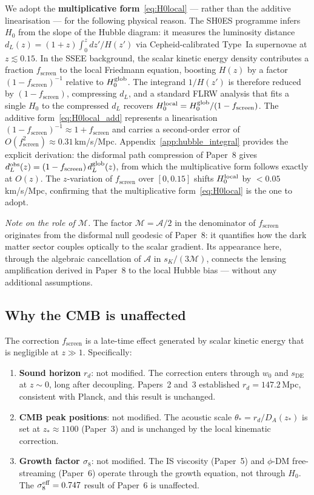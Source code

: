 \documentclass[12pt,a4paper]{article}
\newcommand{\MIRA}{\mathcal{M}}
\newcommand{\AURA}{\mathcal{A}}
\newcommand{\fsc}{f_{\mathrm{screen}}}
\newcommand{\sK}{s_K}          %
\newcommand{\sDE}{s_{\mathrm{DE}}} %
\begin{document}
We adopt the \textbf{multiplicative form}~\eqref{eq:H0local} --- rather than
the additive linearisation --- for the following physical reason.
The SH0ES programme infers $H_0$ from the slope of the Hubble diagram: it
measures the luminosity distance $d_L(z) = (1+z)\!\int_0^z \!dz'/H(z')$ via
Cepheid-calibrated Type~Ia supernovae at $z \lesssim 0.15$.
In the SSEE background, the scalar kinetic energy density contributes a fraction
$\fsc$ to the local Friedmann equation, boosting $H(z)$ by a factor
$(1-\fsc)^{-1}$ relative to $H_0^{\rm glob}$.
The integrand $1/H(z')$ is therefore reduced by $(1-\fsc)$, compressing $d_L$,
and a standard FLRW analysis that fits a single $H_0$ to the compressed $d_L$
recovers $H_0^{\rm local} = H_0^{\rm glob}/(1-\fsc)$.
The additive form~\eqref{eq:H0local_add} represents a linearisation $(1-\fsc)^{-1} \approx 1+\fsc$
and carries a second-order error of $O(\fsc^2) \approx 0.31$\,km/s/Mpc.
Appendix~\ref{app:hubble_integral} provides the explicit derivation: the
disformal path compression of Paper~8 gives $d_L^{\rm obs}(z) = (1-\fsc)\,d_L^{\rm glob}(z)$,
from which the multiplicative form follows exactly at $O(z)$.
The $z$-variation of $\fsc$ over $[0, 0.15]$ shifts $H_0^{\rm local}$ by
$< 0.05$\,km/s/Mpc, confirming that the multiplicative form~\eqref{eq:H0local} is the one to adopt.

\medskip
\noindent\textit{Note on the role of $\MIRA$.}
The factor $\MIRA = \AURA/2$ in the denominator of $\fsc$ originates from
the disformal null geodesic of Paper~8: it quantifies how the dark matter
sector couples optically to the scalar gradient.
Its appearance here, through the algebraic cancellation of $\AURA$ in
$\sK/(3\MIRA)$, connects the lensing amplification derived in Paper~8
to the local Hubble bias --- without any additional assumptions.

\subsection{Why the CMB is unaffected}
\label{sec:CMBsafe}

The correction $\fsc$ is a late-time effect generated by scalar kinetic energy
that is negligible at $z \gg 1$.
Specifically:
\begin{enumerate}
  \item \textbf{Sound horizon} $r_d$: not modified.
        The correction enters through $w_0$ and $\sDE$ at $z \sim 0$,
        long after decoupling.
        Papers~2 and~3 established $r_d = 147.2$\,Mpc, consistent with Planck,
        and this result is unchanged.
  \item \textbf{CMB peak positions}: not modified.
        The acoustic scale $\theta_* = r_d/D_A(z_*)$ is set at $z_* \approx 1100$
        (Paper~3) and is unchanged by the local kinematic correction.
  \item \textbf{Growth factor $\sigma_8$}: not modified.
        The IS viscosity (Paper~5) and $\phi$-DM free-streaming (Paper~6)
        operate through the growth equation, not through $H_0$.
        The $\sigma_8^{\rm eff} = 0.747$ result of Paper~6 is unaffected.
\end{enumerate}
\end{document}
